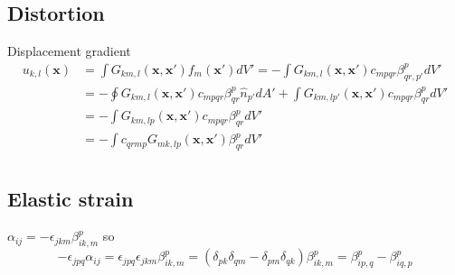 \documentclass[10pt]{report}
\begin{document}
\subsection{Distortion}
Displacement gradient
\begin{align}
u_{k,l}(\bm x)&=\int G_{km,l}(\bm x,\bm x')f_m(\bm x')dV'=-\int G_{km,l}(\bm x,\bm x')c_{mpqr}\beta^p_{qr,p'}dV'\nonumber\\
&=-\oint G_{km,l}(\bm x,\bm x')c_{mpqr}\beta^p_{qr}\hat{n}_{p'}dA'+\int G_{km,lp'}(\bm x,\bm x')c_{mpqr}\beta^p_{qr}dV'\nonumber\\
&=-\int G_{km,lp}(\bm x,\bm x')c_{mpqr}\beta^p_{qr}dV'\nonumber\\
&=-\int c_{qrmp}G_{mk,lp}(\bm x,\bm x')\beta^p_{qr}dV'\nonumber\\
\end{align}


\subsection{Elastic strain}

$\alpha_{ij}=-\epsilon_{jkm}\beta^p_{ik,m}$
so
$$-\epsilon_{jpq}\alpha_{ij}=\epsilon_{jpq}\epsilon_{jkm}\beta^p_{ik,m}=(\delta_{pk}\delta_{qm}-\delta_{pm}\delta_{qk})\beta^p_{ik,m}=\beta^p_{ip,q}-\beta^p_{iq,p}$$
\end{document}
